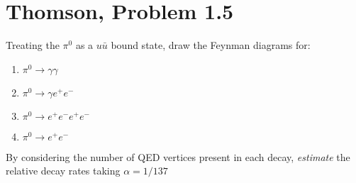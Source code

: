 \documentclass[12pt]{article}
\begin{document}
\section{Thomson, Problem 1.5}
\begin{problem}
  Treating the $\pi^0$ as a $u\bar{u}$ bound state, draw the Feynman diagrams for:
  \begin{enumerate}[label=\alph*)]
  \item $\pi^0\to\gamma\gamma$
  \item $\pi^0\to\gamma e^+e^-$
  \item $\pi^0\to e^+e^-e^+e^-$
  \item $\pi^0\to e^+e^-$
  \end{enumerate}
  By considering the number of QED vertices present in each decay, \emph{estimate} the relative decay rates taking $\alpha=1/137$
\end{problem}
\end{document}
